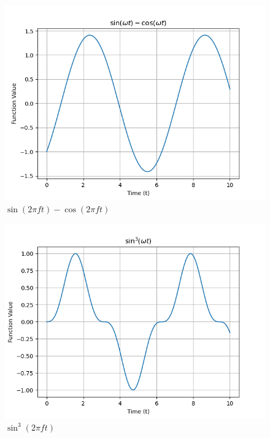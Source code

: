 \documentclass[journal,12pt,onecolumn]{IEEEtran}
\theoremstyle{remark}
\begin{document}
 
 \begin{figure}[h!]
    \centering
    \includegraphics[width=\columnwidth]{ncert-physics/11/14/4/figs/11.14.4 f1.png}
    \caption{$\sin(2\pi f t)- \cos(2\pi f t)$}
    \label{fig:11.14.4.1}
\end{figure}
 \begin{figure}[h!]
    \centering
    \includegraphics[width=\columnwidth]{ncert-physics/11/14/4/figs/11.14.4 f2.png}
    \caption{$\sin^3(2\pi f t)$}
    \label{fig:11.14.4.2}
\end{figure}
\newpage
\end{document}

